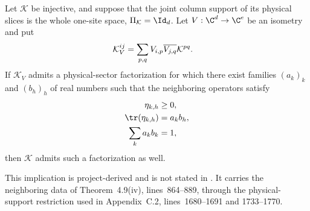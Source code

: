 \begin{lemma}
    \label{thm:mpdo_neighboring_trace_factorization_isometric_embedding_descent}
    \leanok
    Let $\mathcal K$ be injective, and suppose that the joint column support
    of its physical slices is the whole one-site space,
    $\Pi_{\mathcal K}=\Id_d$. Let $V:\C^d\to\C^e$ be an isometry and put
    \begin{align}
        \mathcal K_V^{ij}
         & =\sum_{p,q}V_{i,p}\overline{V_{j,q}}\mathcal K^{pq}.
        \notag
    \end{align}
    If $\mathcal K_V$ admits a physical-sector factorization for which there
    exist families $(a_k)_k$ and $(b_h)_h$ of real numbers such that the
    neighboring operators satisfy
    \begin{align}
        \eta_{k,h}      & \geq 0,
        \notag                     \\
        \tr(\eta_{k,h}) & =a_kb_h,
        \notag                     \\
        \sum_k a_kb_k   & =1,
        \notag
    \end{align}
    then $\mathcal K$ admits such a factorization as well.

    This implication is project-derived and is not stated in
    \cite{Cirac2016MPDO_arXiv}. It carries the neighboring data of
    Theorem~4.9(iv), lines~864--889, through the physical-support restriction
    used in Appendix~C.2, lines~1680--1691 and 1733--1770.
\end{lemma}

